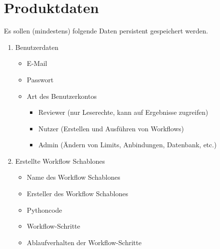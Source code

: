 \chapter{Produktdaten}
Es sollen (mindestens) folgende Daten persistent gespeichert werden.

\renewcommand{\labelenumi}{/PD\arabic{enumi}0/}
 \begin{enumerate}
    \item Benutzerdaten
    \begin{itemize}
        \setlength\itemsep{-1em}
        \item E-Mail
        \item Passwort
        \item Art des Benutzerkontos
        \begin{itemize}
            \setlength\itemsep{-1em}
            \item \gls{Reviewer} (nur Leserechte, kann auf Ergebnisse zugreifen)
            \item \gls{Nutzer} (Erstellen und Ausführen von Workflows)
            \item \gls{Admin} (Ändern von Limits, Anbindungen, Datenbank, etc.)
        \end{itemize}
    \end{itemize}
    
    \item Erstellte \glspl{Workflow Schablone}
        \begin{itemize}
        \setlength\itemsep{-1em}
        \item Name des \glspl{Workflow Schablone}
        \item Ersteller des \glspl{Workflow Schablone}
        \item Pythoncode
        \item \gls{Workflow}-Schritte
        \item Ablaufverhalten der \gls{Workflow}-Schritte
    \end{itemize}
    

\end{enumerate}
